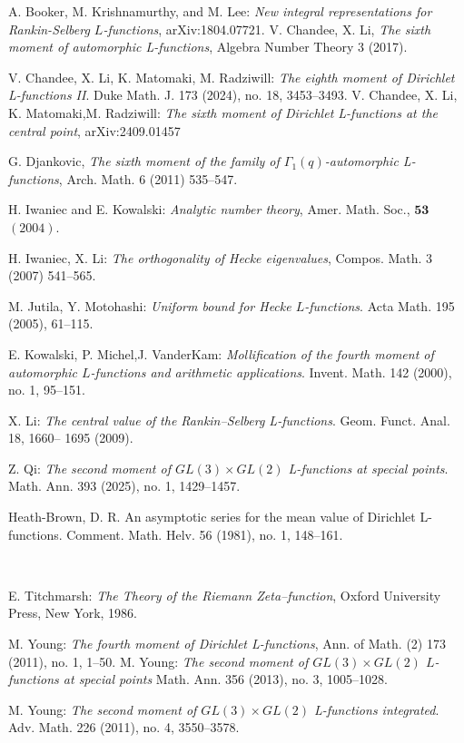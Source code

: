 \documentclass[12pt,a4paper,twoside, reqno]{amsart}
\begin{document}
\begin{thebibliography}{} 
 A. Booker, M. Krishnamurthy, and M. Lee: \emph{New integral representations for Rankin-Selberg
$L$-functions}, arXiv:1804.07721.
 V. Chandee, X. Li, \emph{The sixth moment of automorphic L-functions}, Algebra Number Theory 3 (2017).



 V. Chandee, X.  Li, K. Matomaki, M.  Radziwill: \emph{The eighth moment of Dirichlet L-functions II}.  Duke Math. J. 173 (2024), no. 18, 3453–3493.
V. Chandee, X.  Li, K. Matomaki,M.  Radziwill: \emph{
The sixth moment of Dirichlet L-functions at the central point},  arXiv:2409.01457

  G. Djankovic, \emph{The sixth moment of the family of $\Gamma_1(q) $-automorphic L-functions}, Arch. Math. 6
(2011) 535–547. 

			{H. Iwaniec and E. Kowalski:}
			\emph{Analytic number theory}, {Amer. Math. Soc.}, $\textbf{53}$ $(2004)$.
        

 H. Iwaniec, X. Li: \emph{The orthogonality of Hecke eigenvalues}, Compos. Math. 3 (2007) 541–565.

 M. Jutila, Y. Motohashi: \emph{Uniform bound for Hecke $L$-functions}. Acta Math. 195 (2005), 61–115. 


 E. Kowalski, P. Michel,J. VanderKam: \emph{ Mollification of the fourth moment of automorphic $L$-functions and arithmetic applications}. Invent. Math. 142 (2000), no. 1, 95–151.


X. Li: \emph{The central value of the Rankin–Selberg L-functions}. Geom. Funct. Anal. 18, 1660–
1695 (2009).

 Z. Qi: \emph{  The second moment of $GL(3) \times GL(2)$ L-functions at special points}. Math. Ann. 393 (2025), no. 1, 1429–1457. 



 Heath-Brown, D. R. An asymptotic series for the mean value of Dirichlet L-functions. Comment. Math.
Helv. 56 (1981), no. 1, 148–161.

\



 E. Titchmarsh: \emph{The Theory of the Riemann Zeta--function}, Oxford University Press, New
York, 1986.

M.  Young:
 \emph{The fourth moment of Dirichlet L-functions}, Ann. of Math. (2) 173 (2011), no. 1, 1–50.
M.  Young: \emph{The second moment of $GL(3) \times GL(2)$  $L$-functions at special points}  Math. Ann. 356 (2013), no. 3, 1005–1028.

 M.  Young: \emph{ The second moment of $GL(3) \times GL(2)$    L-functions integrated}.  Adv. Math. 226 (2011), no. 4, 3550–3578.
 
\end{thebibliography}{} 
\end{document}
